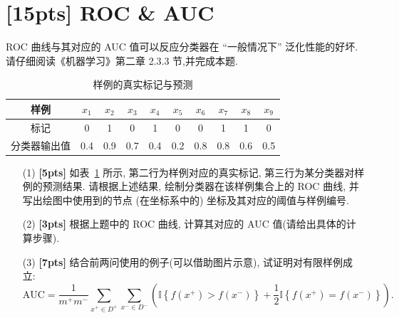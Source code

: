 \documentclass[a4paper,UTF8]{article}
\numberwithin{equation}{section}
\theoremstyle{definition}
\begin{document}
\section{[15pts] ROC \& AUC}
 ROC 曲线与其对应的 AUC 值可以反应分类器在 “一般情况下” 泛化性能的好坏. 请仔细阅读《机器学习》第二章 2.3.3 节,并完成本题.
\begin{table}[ht]
	\centering
	\caption{样例的真实标记与预测}
	\begin{tabular}{c|ccccccccc}
		\hline 样例 & $x_1$ & $x_2$ & $x_3$ & $x_4$ & $x_5$ & $x_6$ & $x_7$ & $x_8$ & $x_9$ \\
		\hline 标记 & 0 & 1 & 0 & 1 & 0 & 0 & 1 & 1 & 0 \\
		\hline 分类器输出值 & 0.4 & 0.9 & 0.7 & 0.4 & 0.2 & 0.8 & 0.8 & 0.6 & 0.5 \\
		\hline
	\end{tabular}
	\label{tab:samples}
\end{table} 
\begin{enumerate}
    \item[(1)] \textbf{[5pts]}  如表~\ref{tab:samples} 所示, 第二行为样例对应的真实标记, 第三行为某分类器对样例的预测结果. 请根据上述结果, 绘制分类器在该样例集合上的 ROC 曲线, 并写出绘图中使用到的节点 (在坐标系中的) 坐标及其对应的阈值与样例编号.
    \item[(2)] \textbf{[3pts]}  根据上题中的 ROC 曲线, 计算其对应的 AUC 值(请给出具体的计算步骤).
    \item[(3)] \textbf{[7pts]}  结合前两问使用的例子(可以借助图片示意), 试证明对有限样例成立:
    \begin{equation}
        \label{eq:auc}
            \text{AUC} = \frac{1}{m^+m^-}\sum_{x^+\in D^+}\sum_{x^-\in D^-}\left(\mathbb{I}\left\{f(x^+) > f(x^-)\right\}+\frac{1}{2}\mathbb{I}\left\{f(x^+)=f(x^-)\right\}\right).
    \end{equation}    
\end{enumerate}
\end{document}
